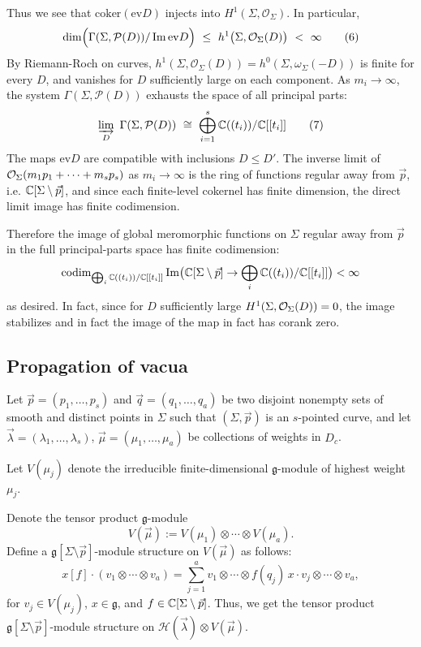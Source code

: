 \documentclass[12pt]{article}
\begin{document}
\begin{remark}
    Thus we see that $\mathrm{coker}(\mathrm{ev}D)$ injects into $H^1(\Sigma,\mathcal O_\Sigma)$. In particular,
    \[
        \dim\Bigl(\Gamma(\Sigma,\mathcal P(D)) / \operatorname{Im}\mathrm{ev}D\Bigr)
        \ \le\ h^1\bigl(\Sigma,\mathcal O_\Sigma(D)\bigr)
        \ <\ \infty
        \tag{6}
    \]
    By Riemann-Roch on curves, $h^1(\Sigma,\mathcal O_\Sigma(D))=h^0(\Sigma,\omega_\Sigma(-D))$ is finite for every $D$, and vanishes for $D$ sufficiently large on each component. As $m_i\to\infty$, the system $\Gamma(\Sigma,\mathcal P(D))$ exhausts the space of all principal parts:
    \[
        \varinjlim_{D}\ \Gamma(\Sigma,\mathcal P(D))
        \ \cong\ \bigoplus_{i=1}^s \mathbb{C}((t_i))/\mathbb{C}[[t_i]]
        \tag{7}
    \]
    The maps $\mathrm{ev}D$ are compatible with inclusions $D\le D'$. The inverse limit of ${\mathcal{O}}_\Sigma(m_1 p_1 + \cdots + m_s p_s)$ as $m_i\to\infty$ is the ring of functions regular away from $\vec p$, i.e. $\mathbb{C}[\Sigma \setminus \vec p]$, and since each finite-level cokernel has finite dimension, the direct limit image has finite codimension.

    Therefore the image of global meromorphic functions on $\Sigma$ regular away from $\vec p$ in the full principal-parts space has finite codimension:
    \[
        \operatorname{codim}_{\bigoplus_i \mathbb{C}((t_i))/\mathbb{C}[[t_i]]} \operatorname{Im}\bigl(\mathbb{C}[\Sigma \setminus \vec p]\to \bigoplus_i \mathbb{C}((t_i))/\mathbb{C}[[t_i]]\bigr) <\infty
    \] as desired. In fact, since for $D$ sufficiently large $H^1(\Sigma,{\mathcal{O}}_\Sigma(D))=0$, the image stabilizes and in fact the image of the map in fact has corank zero.
\end{remark}
\subsection{Propagation of vacua}
Let $\vec p=(p_1,\dots,p_s)$ and $\vec q=(q_1,\dots,q_a)$ be two disjoint nonempty sets of smooth and distinct points in $\Sigma$ such that $(\Sigma,\vec p)$ is an $s$-pointed curve, and let $\vec\lambda=(\lambda_1,\dots,\lambda_s)$, $\vec\mu=(\mu_1,\dots,\mu_a)$ be collections of weights in $D_c$.

Let $V(\mu_j)$ denote the irreducible finite-dimensional $\mathfrak g$-module of highest weight $\mu_j$.
\begin{definition}[Definition~2.2.1]
    Denote the tensor product $\mathfrak g$-module
    \[
        V(\vec\mu):=V(\mu_1)\otimes\cdots\otimes V(\mu_a).
        \tag{1}
    \]
    Define a $\mathfrak g[\Sigma\setminus\vec p]$-module structure on $V(\vec\mu)$ as follows:
    \[
        x[f]\cdot(v_1\otimes\cdots\otimes v_a)
        =\sum_{j=1}^a
        v_1\otimes\cdots\otimes f(q_j)\,x\cdot v_j\otimes\cdots\otimes v_a,
        \tag{action 2}
    \]
    for $v_j\in V(\mu_j)$, $x\in\mathfrak g$, and
    $f\in\mathbb{C}[\Sigma\setminus\vec p]$.
    Thus, we get the tensor product
    $\mathfrak g[\Sigma\setminus\vec p]$-module structure on
    $\mathcal H(\vec\lambda)\otimes V(\vec\mu)$.
\end{definition}
\end{document}
